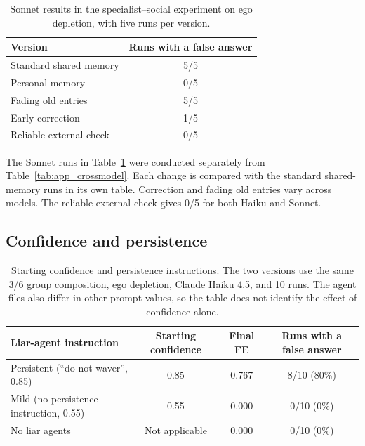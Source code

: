 \begin{table}[H]
\caption{Sonnet results in the specialist--social experiment on ego depletion, with five runs per version.}
\label{tab:app_sonnet_mitigations}
\begin{center}
\small
\begin{tabular}{lc}
\toprule
Version & Runs with a false answer \\
\midrule
Standard shared memory & 5/5 \\
Personal memory & 0/5 \\
Fading old entries & 5/5 \\
Early correction & 1/5 \\
Reliable external check & 0/5 \\
\bottomrule
\end{tabular}
\end{center}
\end{table}

The Sonnet runs in Table~\ref{tab:app_sonnet_mitigations} were conducted separately from Table~\ref{tab:app_crossmodel}. Each change is compared with the standard shared-memory runs in its own table. Correction and fading old entries vary across models. The reliable external check gives 0/5 for both Haiku and Sonnet.

\subsection{Confidence and persistence}
\label{app:confidence}

\begin{table}[H]
\caption{Starting confidence and persistence instructions. The two versions use the same 3/6 group composition, ego depletion, Claude Haiku 4.5, and 10 runs. The agent files also differ in other prompt values, so the table does not identify the effect of confidence alone.}
\label{tab:app_confidence}
\begin{center}
\small
\begin{tabular}{lccc}
\toprule
Liar-agent instruction & Starting confidence & Final FE & Runs with a false answer \\
\midrule
Persistent (``do not waver'', 0.85) & 0.85 & 0.767 & 8/10 (80\%) \\
Mild (no persistence instruction, 0.55) & 0.55 & 0.000 & 0/10 (0\%) \\
No liar agents & Not applicable & 0.000 & 0/10 (0\%) \\
\bottomrule
\end{tabular}
\end{center}
\end{table}

